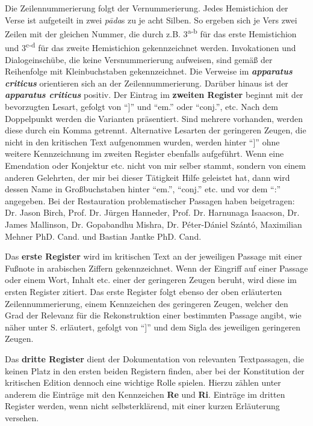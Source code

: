 \documentclass[a4paper,12pt]{article}
\begin{document}
{Die Zeilennummerierung folgt der Vernummerierung. Jedes Hemistichion der Verse ist aufgeteilt in zwei \textit{pāda}s zu je acht Silben. So ergeben sich je Vers zwei Zeilen mit der gleichen Nummer, die durch z.B. 3\textsuperscript{a-b} für das erste Hemistichion und 3\textsuperscript{c-d} für das zweite Hemistichion gekennzeichnet werden. Invokationen und Dialogeinschübe, die keine Versnummerierung aufweisen, sind gemäß der Reihenfolge mit Kleinbuchstaben gekennzeichnet. Die Verweise im \textbf{\textit{apparatus criticus}} orientieren sich an der Zeilennummerierung. Darüber hinaus ist der \textbf{\textit{apparatus criticus}} positiv. Der Eintrag im \textbf{zweiten Register} beginnt mit der bevorzugten Lesart, gefolgt von ``]'' und ``em.'' oder ``conj.'', etc. Nach dem Doppelpunkt werden die Varianten präsentiert. Sind mehrere vorhanden, werden diese durch ein Komma getrennt. Alternative Lesarten der geringeren Zeugen, die nicht in den kritischen Text aufgenommen wurden, werden hinter ``]'' ohne weitere Kennzeichnung im zweiten Register ebenfalls aufgeführt. Wenn eine Emendation oder Konjektur etc. nicht von mir selber stammt, sondern von einem anderen Gelehrten, der mir bei dieser Tätigkeit Hilfe geleistet hat, dann wird dessen Name in Großbuchstaben hinter ``em.'', ``conj.'' etc. und vor dem ``:'' angegeben. Bei der Restauration problematischer Passagen haben beigetragen: Dr. Jason Birch, Prof. Dr. Jürgen Hanneder, Prof. Dr. Harnunaga Isaacson, Dr. James Mallinson, Dr. Gopabandhu Mishra, Dr. Péter-Dániel Szántó, Maximilian Mehner PhD. Cand. und Bastian Jantke PhD. Cand.  

    Das \textbf{erste Register} wird im kritischen Text an der jeweiligen Passage mit einer Fußnote in arabischen Ziffern gekennzeichnet. Wenn der Eingriff auf einer Passage oder einem Wort, Inhalt etc. einer der geringeren Zeugen beruht, wird diese im ersten Register zitiert. Das erste Register folgt ebenso der oben erläuterten Zeilennummerierung, einem Kennzeichen des geringeren Zeugen, welcher den Grad der Relevanz für die Rekonstruktion einer bestimmten Passage angibt, wie näher unter S.\pageref{kennz} erläutert, gefolgt von ``]'' und dem Sigla des jeweiligen geringeren Zeugen.

      Das \textbf{dritte Register} dient der Dokumentation von relevanten Textpassagen, die keinen Platz in den ersten beiden Registern finden, aber bei der Konstitution der kritischen Edition dennoch eine wichtige Rolle spielen. Hierzu zählen unter anderem die Einträge mit den Kennzeichen \textbf{Re} und \textbf{Ri}. Einträge im dritten Register werden, wenn nicht selbsterklärend, mit einer kurzen Erläuterung versehen.

}
\end{document}
